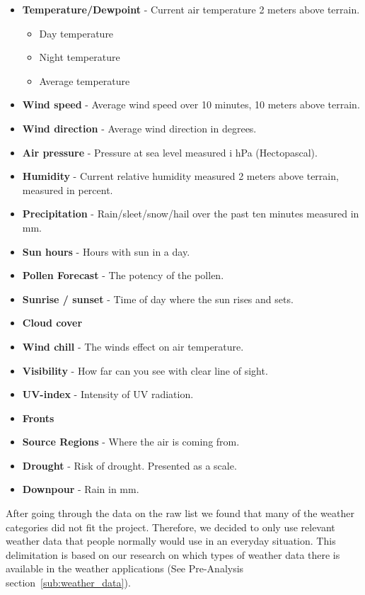 \begin{itemize}
     \item \textbf{Temperature/Dewpoint} - Current air temperature 2 meters above terrain.
     \begin{itemize}
         \item Day temperature
         \item Night temperature
         \item Average temperature
     \end{itemize}
     \item \textbf{Wind speed} - Average wind speed over 10 minutes, 10 meters above terrain.
     \item \textbf{Wind direction} - Average wind direction in degrees.
     \item \textbf{Air pressure} - Pressure at sea level measured i hPa (Hectopascal).
     \item \textbf{Humidity} - Current relative humidity measured 2 meters above terrain, measured in percent.
     \item \textbf{Precipitation} - Rain/sleet/snow/hail over the past ten minutes measured in mm.
     \item \textbf{Sun hours} - Hours with sun in a day.
     \item \textbf{Pollen Forecast} - The potency of the pollen. 
     \item \textbf{Sunrise / sunset} - Time of day where the sun rises and sets.
     \item \textbf{Cloud cover}
     \item \textbf{Wind chill} - The winds effect on air temperature.
     \item \textbf{Visibility} - How far can you see with clear line of sight.
     \item \textbf{UV-index} - Intensity of UV radiation.
     \item \textbf{Fronts} 
     \item \textbf{Source Regions} - Where the air is coming from.
     \item \textbf{Drought} - Risk of drought. Presented as a scale.
     \item \textbf{Downpour} - Rain in mm.
 \end{itemize}

After going through the data on the raw list we found that many of the weather categories did not fit the project. 
Therefore, we decided to only use relevant weather data that people normally would use in an everyday situation. 
This delimitation is based on our research on which types of weather data there is available in the weather applications (See Pre-Analysis section~\ref{sub:weather_data}).

